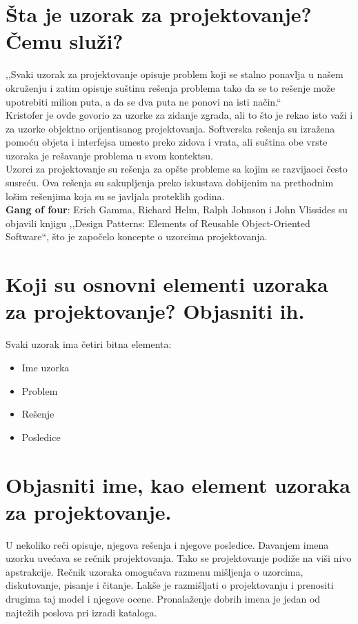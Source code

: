 \documentclass[a4paper]{article}
\begin{document}
\section{Šta je uzorak za projektovanje? Čemu služi?}
  ,,Svaki uzorak za projektovanje opisuje problem koji se stalno ponavlja u našem okruženju i zatim
  opisuje suštinu rešenja problema tako da se to rešenje može upotrebiti milion puta, a da se
  dva puta ne ponovi na isti način.`` 
  \\

  Kristofer je ovde govorio za uzorke za zidanje zgrada, ali to što je rekao isto važi i za
  uzorke objektno orijentisanog projektovanja. Softverska rešenja su izražena pomoću objeta i 
  interfejsa umesto preko zidova i vrata, ali suština obe vrste uzoraka je rešavanje problema
  u svom kontektsu.\\
  \indent Uzorci za projektovanje su rešenja za opšte probleme sa kojim se razvijaoci često susreću.
  Ova rešenja su sakupljenja preko iskustava dobijenim na prethodnim lošim rešenjima koja su
  se javljala proteklih godina.\\
  \indent \textbf{Gang of four}: Erich Gamma, Richard Helm, Ralph Johnson i John Vlissides su objavili
  knjigu ,,Design Patterns: Elements of Reusable Object-Oriented Software``, što je započelo 
  koncepte o uzorcima projektovanja.

\section{Koji su osnovni elementi uzoraka za projektovanje? Objasniti ih.}
  Svaki uzorak ima četiri bitna elementa:
  \begin{itemize}
    \item Ime uzorka
    \item Problem
    \item Rešenje
    \item Posledice
  \end{itemize}

\section{Objasniti ime, kao element uzoraka za projektovanje.}
  U nekoliko reči opisuje, njegova rešenja i njegove posledice.
  Davanjem imena uzorku uvećava se rečnik projektovanja.
  Tako se projektovanje podiže na viši nivo apstrakcije.
  Rečnik uzoraka omogućava razmenu mišljenja o uzorcima, diskutovanje, pisanje i čitanje.
  Lakše je razmišljati o projektovanju i prenositi drugima taj model i njegove ocene.
  Pronalaženje dobrih imena je jedan od najtežih poslova pri izradi kataloga.
\end{document}
